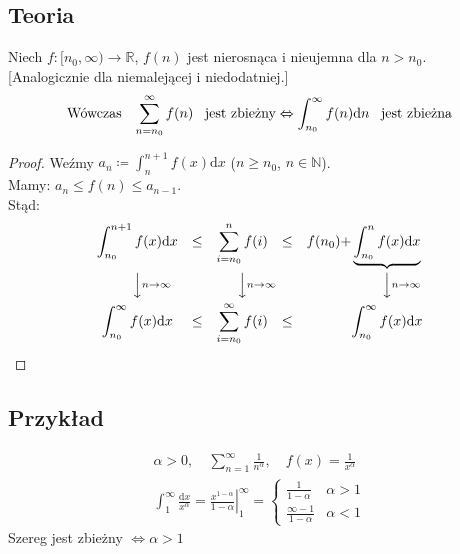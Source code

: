 \documentclass{article}
\theoremstyle{definition}
\theoremstyle{case}
\let\iff\Leftrightarrow
\begin{document}
	\subsection{Teoria}
	Niech $f \colon [n_0,\infty) \to \mathbb{R}$, $f(n)$ jest nierosnąca i nieujemna dla $n> n_0$.
		[Analogicznie dla niemalejącej i niedodatniej.]
	\begin{equation*}
		\textnormal{Wówczas \enskip}
		\sum_{n={n_0}}^\infty f(n) \textnormal{ \enskip jest zbieżny}
		\iff
		\int_{n_0}^\infty f(n) \mathrm d n \textnormal{ \enskip jest zbieżna}
	\end{equation*}
	\begin{proof}%
		Weźmy $a_n \coloneqq \int_n^{n+1} f(x) \mathrm d x$ ($n \geq n_0$, $n \in \mathbb{N}$).
		\\Mamy: $a_n \leq f(n) \leq a_{n-1}$.
		\\Stąd:
		\begin{equation*}
		\begin{CD}
			\displaystyle\int_{n_0}^{n+1}f(x) \mathrm d x @.
			\quad \leq \quad @.
			\displaystyle\sum_{i=n_0}^nf(i) @.
			\quad \leq \quad @.
			f(n_0) + @. \underbrace{\int_{n_0}^nf(x) \mathrm d x}
		\\ @VV{n \to \infty}V @. @VV{n \to \infty}V @. @. @VV{n \to \infty}V
		\\ \displaystyle\int_{n_0}^\infty f(x) \mathrm d x @.
		\quad \leq \quad @.
		\displaystyle\sum_{i=n_0}^\infty f(i) @.
		\leq @.
		@. \displaystyle\int_{n_0}^\infty f(x) \mathrm d x
		\end{CD}
		\end{equation*}
	\end{proof}

	\subsection{Przykład}

	\begin{gather*}
		\alpha > 0 ,\quad \displaystyle\sum_{n=1}^\infty \frac{1}{n^\alpha} ,\quad f(x) = \frac{1}{x^\alpha}
		\\\int_1^\infty \frac{\mathrm d x}{x^\alpha}
		= \left. \frac{x^{1-\alpha}}{1-\alpha} \right|_1^\infty
		= \left\{
			\begin{array}{lr}
				\frac{1}{1-\alpha} & \alpha > 1
				\\\frac{\infty-1}{1-\alpha} & \alpha < 1
			\end{array}
			\right.
	\end{gather*}
	Szereg jest zbieżny $\iff \alpha > 1$
\end{document}
